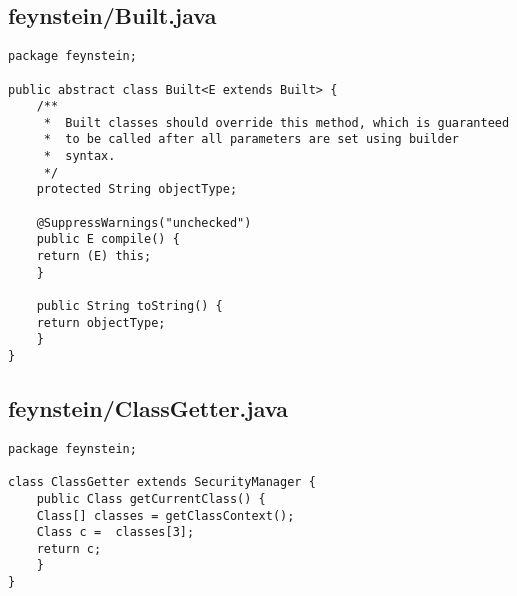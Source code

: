 \subsection*{feynstein/Built.java}
\begin{lstlisting}
package feynstein;

public abstract class Built<E extends Built> {
    /**
     *  Built classes should override this method, which is guaranteed
     *  to be called after all parameters are set using builder
     *  syntax.
     */
    protected String objectType;

    @SuppressWarnings("unchecked")
    public E compile() {
	return (E) this;
    }

    public String toString() {
	return objectType;
    }
}\end{lstlisting}

\subsection*{feynstein/ClassGetter.java}
\begin{lstlisting}
package feynstein;

class ClassGetter extends SecurityManager {
    public Class getCurrentClass() {
	Class[] classes = getClassContext();
	Class c =  classes[3];
	return c;
    }
}\end{lstlisting}

